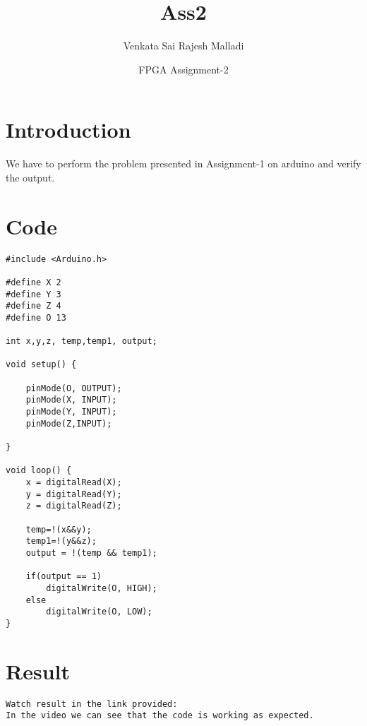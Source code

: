 \documentclass{article}
\title{Ass2}
\author{Venkata Sai Rajesh Malladi}
\date{FPGA Assignment-2}
\begin{document}
\maketitle

\section{Introduction}

We have to perform the problem presented in Assignment-1 on arduino and verify the output.

\section{Code}

\begin{verbatim}
#include <Arduino.h>

#define X 2
#define Y 3
#define Z 4
#define O 13

int x,y,z, temp,temp1, output;

void setup() {

	pinMode(O, OUTPUT);
	pinMode(X, INPUT);
	pinMode(Y, INPUT);
	pinMode(Z,INPUT);
	
}

void loop() {
    x = digitalRead(X);
    y = digitalRead(Y);
    z = digitalRead(Z);

    temp=!(x&&y);
    temp1=!(y&&z);
    output = !(temp && temp1);
    
    if(output == 1)
	    digitalWrite(O, HIGH);
    else
	    digitalWrite(O, LOW);
}

\end{verbatim}

\section{Result}

\begin{verbatim}
Watch result in the link provided: 
In the video we can see that the code is working as expected.
\end{verbatim}
\end{document}
